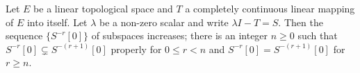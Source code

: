 Let $E$ be a linear topological space and $T$ a completely continuous linear mapping of $E$ into itself. Let $\lambda$ be a non-zero scalar and write $\lambda I - T = S$. Then the sequence $\{S^{-r}[0]\}$ of subspaces increases; there is an integer $n \geq 0$ such that $S^{-r}[0] \subsetneq S^{-(r+1)}[0]$ properly for $0 \leq r < n$ and $S^{-r}[0] = S^{-(r+1)}[0]$ for $r \geq n$.
